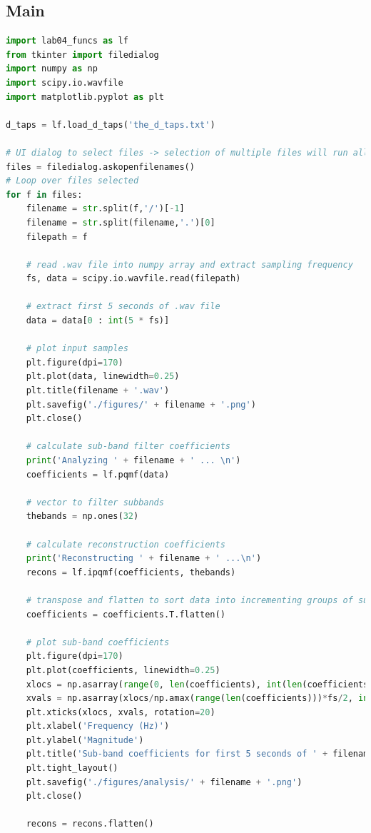 \documentclass[11pt,a4paper]{article}
\begin{document}
\subsection{Main}
\begin{lstlisting}[language=Python]
import lab04_funcs as lf
from tkinter import filedialog
import numpy as np
import scipy.io.wavfile
import matplotlib.pyplot as plt

d_taps = lf.load_d_taps('the_d_taps.txt')

# UI dialog to select files -> selection of multiple files will run all functions for each file
files = filedialog.askopenfilenames()
# Loop over files selected
for f in files:
    filename = str.split(f,'/')[-1]
    filename = str.split(filename,'.')[0]
    filepath = f

    # read .wav file into numpy array and extract sampling frequency
    fs, data = scipy.io.wavfile.read(filepath)
    
    # extract first 5 seconds of .wav file
    data = data[0 : int(5 * fs)]

    # plot input samples
    plt.figure(dpi=170)
    plt.plot(data, linewidth=0.25)
    plt.title(filename + '.wav')
    plt.savefig('./figures/' + filename + '.png')
    plt.close()

    # calculate sub-band filter coefficients
    print('Analyzing ' + filename + ' ... \n')
    coefficients = lf.pqmf(data)

    # vector to filter subbands
    thebands = np.ones(32)

    # calculate reconstruction coefficients
    print('Reconstructing ' + filename + ' ...\n')
    recons = lf.ipqmf(coefficients, thebands)

    # transpose and flatten to sort data into incrementing groups of subband coefficients
    coefficients = coefficients.T.flatten()

    # plot sub-band coefficients
    plt.figure(dpi=170)
    plt.plot(coefficients, linewidth=0.25)
    xlocs = np.asarray(range(0, len(coefficients), int(len(coefficients)/10)))
    xvals = np.asarray(xlocs/np.amax(range(len(coefficients)))*fs/2, int)
    plt.xticks(xlocs, xvals, rotation=20)
    plt.xlabel('Frequency (Hz)')
    plt.ylabel('Magnitude')
    plt.title('Sub-band coefficients for first 5 seconds of ' + filename + '.wav')
    plt.tight_layout()
    plt.savefig('./figures/analysis/' + filename + '.png')
    plt.close()

    recons = recons.flatten()
    

\end{lstlisting}
\end{document}
